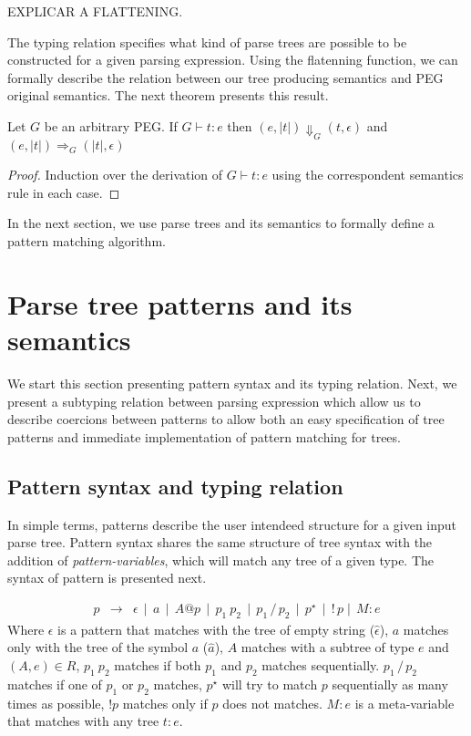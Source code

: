 EXPLICAR A FLATTENING.

The typing relation specifies what kind of parse trees are possible to be
constructed for a given parsing expression. Using the flatenning function,
we can formally describe the relation between our tree producing semantics
and PEG original semantics.
The next theorem presents this result.

\begin{theorem}
  Let $G$ be an arbitrary PEG. If $G \vdash t : e$ then $(e, |t|) \Downarrow_G (t, \epsilon)$ and
  $(e, |t|)\Rightarrow_G (|t|, \epsilon)$
\end{theorem}
\begin{proof}
  Induction over the derivation of $G \vdash t : e$ using the correspondent semantics rule in each case.
\end{proof}

In the next section, we use parse trees and its semantics to formally define
a pattern matching algorithm.

\section{Parse tree patterns and its semantics}

We start this section presenting pattern syntax and its typing relation.
Next, we present a subtyping relation between parsing expression which allow us
to describe coercions between patterns to allow both an easy specification of tree
patterns and immediate implementation of pattern matching for trees.

\subsection{Pattern syntax and typing relation}

In simple terms, patterns describe the user intendeed structure for a given
input parse tree. Pattern syntax shares the same structure of tree syntax with
the addition of \emph{pattern-variables}, which will match any tree of a given type.
The syntax of pattern is presented next.

\[
    \begin{array}{lcl}
        p & \to & \epsilon \, \mid \, a \, \mid \, A@p\, \mid \,p_1\:p_2\,
                \mid\,p_1\,/\,p_2\, \mid \,p^\star\, \mid \,!\,p
                \mid \, M : e
    \end{array}
\]
Where \(\epsilon\) is a pattern that matches with the tree of
empty string (\(\hat{\epsilon}\)),
\(a\) matches only with the tree of the symbol \(a\) (\(\hat{a}\)), \(A\) matches
with a subtree of type \(e\) and \((A, e) \in R\), \(p_1\:p_2\) matches if both
\(p_1\) and \(p_2\) matches sequentially. \(p_1\,/\,p_2\) matches if one of \(p_1\)
or \(p_2\) matches, \(p^\star\) will try to match \(p\) sequentially as many times
as possible, \(!p\) matches only if \(p\) does not matches. \(M : e\) is a meta-variable
that matches with any tree \(t : e\).

